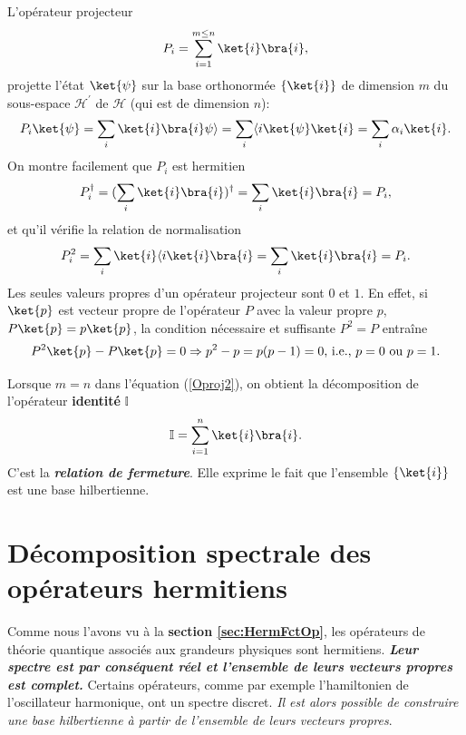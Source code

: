 L'opérateur projecteur
\begin{equation}
P_{i}=\sum_{i=1}^{m\leq n}\ket{i}\bra{i},
\label{Oproj2}
\end{equation}
projette l'état $\ket{\psi}$ sur la base orthonormée $\{\ket{i}\} $ de dimension
$m$ du sous-espace $\mathcal{H}^{\prime}$ de $\mathcal{H}$ (qui est de dimension
$n$):
\begin{equation}
P_{i}\ket{\psi}=\sum_{i}\ket{i}\bra{i}\psi\rangle=\sum_{i}\langle i\ket{\psi}
\ket{i}=\sum_{i}\alpha_{i}\ket{i}.
\end{equation}
On montre facilement que $P_{i}$ est hermitien%
\begin{equation}
P_{i}^{\dagger}=(\sum_{i}\ket{i}\bra{i})^{\dagger}=\sum_{i}\ket{i}\bra{i}=P_{i},
\end{equation}
et qu'il vérifie la relation de normalisation
\begin{equation}
P_{i}^{2}=\sum_{i}\ket{i}\langle i\ket{i}\bra{i}=\sum_{i}\ket{i}\bra{i} =P_{i}.
\end{equation}
Les seules valeurs propres d'un opérateur projecteur sont $0$ et $1$. En effet,
si $\ket{p}$ est vecteur propre de l'opérateur $P$ avec la valeur propre $p$,
$P\ket{p}=p\ket{p}$, la condition nécessaire et suffisante $P^{2}=P$ entraîne%
\begin{equation}
P^{2}\ket{p}-P\ket{p}=0\Rightarrow p^{2}-p=p(p-1)=0\text{, i.e., }p=0\text{ ou
}p=1.
\end{equation}

Lorsque $m=n$ dans l'équation (\ref{Oproj2}), on obtient la décomposition de
l'opérateur \textbf{identité} $\mathbb{I}$
\begin{equation}
\mathbb{I}=\sum_{i=1}^{n}\ket{i}\bra{i} .
\end{equation}
C'est la \textbf{\emph{relation de fermeture}}. Elle exprime le fait que
l'ensemble $\{\ket{i}\}$ est une base hilbertienne.

\section{Décomposition spectrale des opérateurs hermitiens}

\label{sec:DSO}

Comme nous l'avons vu à la \textbf{section \ref{sec:HermFctOp}}, les opérateurs
de théorie quantique associés aux grandeurs physiques sont hermitiens.
\textbf{\emph{Leur spectre est par conséquent réel et l'ensemble de leurs
vecteurs propres est complet.}} Certains opérateurs, comme par exemple
l'hamiltonien de l'oscillateur harmonique, ont un spectre discret. \emph{Il est
alors possible de construire une base hilbertienne à partir de l'ensemble de
leurs vecteurs propres}.

